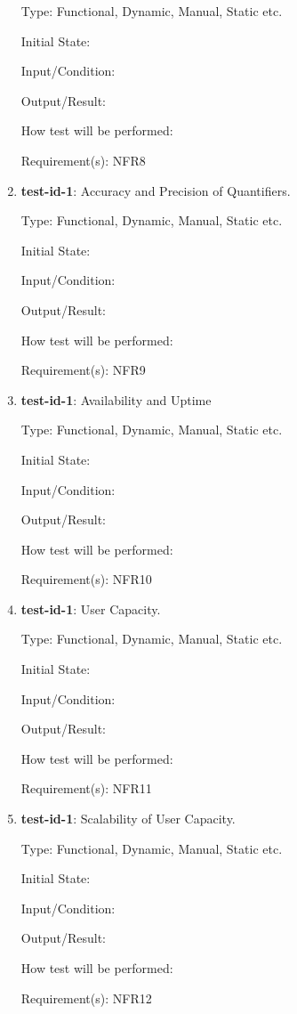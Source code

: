 \documentclass[12pt, titlepage]{article}
\begin{document}
\begin{enumerate}
		Type: Functional, Dynamic, Manual, Static etc.
		
		Initial State: 
		
		Input/Condition: 
		
		Output/Result: 
		
		How test will be performed: 
		
		Requirement(s): NFR8
		
		\item{\textbf{test-id-1}}: Accuracy and Precision of Quantifiers.
		
		Type: Functional, Dynamic, Manual, Static etc.
		
		Initial State: 
		
		Input/Condition: 
		
		Output/Result: 
		
		How test will be performed: 
		
		Requirement(s): NFR9
		
		\item{\textbf{test-id-1}}: Availability and Uptime
		
		Type: Functional, Dynamic, Manual, Static etc.
		
		Initial State: 
		
		Input/Condition: 
		
		Output/Result: 
		
		How test will be performed: 
		
		Requirement(s): NFR10
		
		\item{\textbf{test-id-1}}: User Capacity.
		
		Type: Functional, Dynamic, Manual, Static etc.
		
		Initial State: 
		
		Input/Condition: 
		
		Output/Result: 
		
		How test will be performed: 
		
		Requirement(s): NFR11
		
		\item{\textbf{test-id-1}}: Scalability of User Capacity.
		
		Type: Functional, Dynamic, Manual, Static etc.
		
		Initial State: 
		
		Input/Condition: 
		
		Output/Result: 
		
		How test will be performed: 
		
		Requirement(s): NFR12

\end{enumerate}
\end{document}
